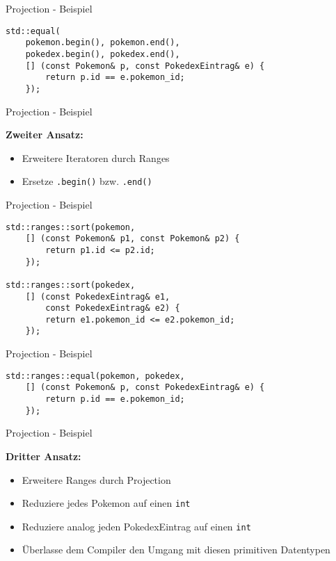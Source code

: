 \begin{frame}[fragile]{Projection - Beispiel}
    \begin{verbatim}
std::equal(
    pokemon.begin(), pokemon.end(),
    pokedex.begin(), pokedex.end(),
    [] (const Pokemon& p, const PokedexEintrag& e) {
        return p.id == e.pokemon_id;
    });
    \end{verbatim}
\end{frame}

\begin{frame}{Projection - Beispiel}
    \begin{center}
        \textbf{Zweiter Ansatz:}
    \end{center}

    \begin{itemize}
        \item Erweitere Iteratoren durch Ranges
        \item Ersetze \texttt{.begin()} bzw. \texttt{.end()}
    \end{itemize}
\end{frame}

\begin{frame}[fragile]{Projection - Beispiel}
    \begin{verbatim}
std::ranges::sort(pokemon,
    [] (const Pokemon& p1, const Pokemon& p2) {
        return p1.id <= p2.id;
    });

std::ranges::sort(pokedex,
    [] (const PokedexEintrag& e1,
        const PokedexEintrag& e2) {
        return e1.pokemon_id <= e2.pokemon_id;
    });
    \end{verbatim}
\end{frame}

\begin{frame}[fragile]{Projection - Beispiel}
    \begin{verbatim}
std::ranges::equal(pokemon, pokedex,
    [] (const Pokemon& p, const PokedexEintrag& e) {
        return p.id == e.pokemon_id;
    });
    \end{verbatim}
\end{frame}

\begin{frame}{Projection - Beispiel}
    \begin{center}
        \textbf{Dritter Ansatz:}
    \end{center}

    \begin{itemize}
        \item Erweitere Ranges durch Projection
        \item Reduziere jedes Pokemon auf einen \texttt{int}
        \item Reduziere analog jeden PokedexEintrag auf einen \texttt{int}
        \item Überlasse dem Compiler den Umgang mit diesen primitiven Datentypen
    \end{itemize}
\end{frame}

